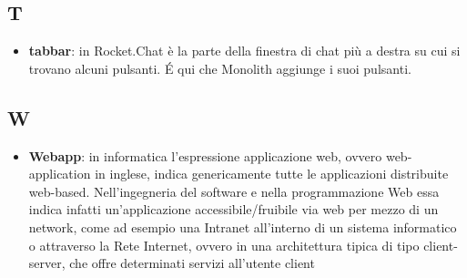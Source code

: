 \subsection*{T}
\begin{itemize}
\item
\textbf{tabbar}: in Rocket.Chat è la parte della finestra di chat più a destra su cui si trovano alcuni pulsanti. \'E qui che Monolith aggiunge i suoi pulsanti.
\end{itemize}
\newpage

\subsection*{W}
\begin{itemize}
\item
\textbf{Webapp}: in informatica l'espressione applicazione web, ovvero web-application in inglese, indica genericamente tutte le applicazioni distribuite web-based. Nell'ingegneria del software e nella programmazione Web essa indica infatti un'applicazione accessibile/fruibile via web per mezzo di un network, come ad esempio una Intranet all'interno di un sistema informatico o attraverso la Rete Internet, ovvero in una architettura tipica di tipo client-server, che offre determinati servizi all'utente client
\end{itemize}
\newpage

